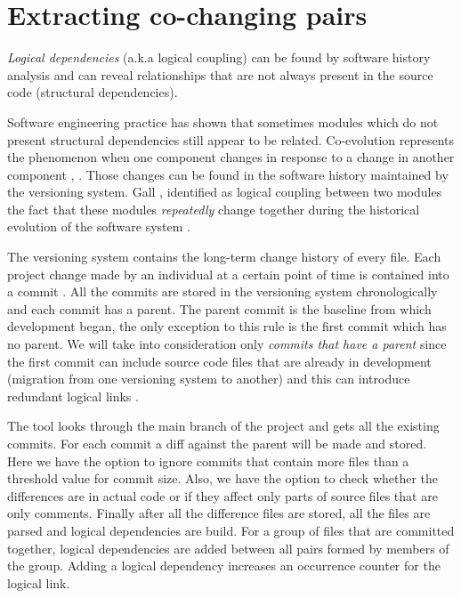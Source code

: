 \documentclass[12pt]{mitthesis}
\begin{document}
\section{Extracting co-changing pairs}
\label{sec:copairs_extraction}
\textit{Logical dependencies} (a.k.a logical coupling) can be found by software history analysis and can reveal relationships that are not always present in the source code (structural dependencies).  

Software engineering practice has shown that sometimes modules which do not present structural dependencies still appear to be related. Co-evolution represents the phenomenon when one component changes in response to a change in another component \cite{Yu:2007:UCC:1231330.1231370}, \cite{5166450}. Those changes can be found in the software history maintained by the versioning system. Gall \cite{Gall:1998:DLC:850947.853338}, \cite{Gall:2003:CRH:942803.943741} identified as logical coupling between two modules the fact that these modules  \textit{repeatedly} change together during the historical evolution of the software system \cite{6606615}.

The versioning system contains the long-term change history of every file. Each project change made by an individual at a certain point of time is contained into a commit \cite{svn}. All the commits are stored in the versioning system chronologically and each commit has a parent. The parent commit is the baseline from which development began, the only exception to this rule is the first commit which has no parent. We will take into consideration only \textit{commits that have a parent} since the first commit can include source code files that are already in development (migration from one versioning system to another) and this can introduce redundant logical links \cite{DBLP:journals/jss/AjienkaC17}. 

The tool looks through the main branch of the project and gets all the existing commits. For each commit a diff against the parent will be made and stored. Here we have the option to ignore commits that contain more files than a threshold value for commit size. Also, we have the option to check whether the differences are in actual code or if they affect only parts of source files that are only comments.  Finally after all the difference files are stored, all the files are parsed and logical dependencies are build. For a group of files that are committed together, logical dependencies are added between all pairs formed by members of the group. Adding a logical dependency increases an occurrence counter for the logical link. \\
\end{document}
